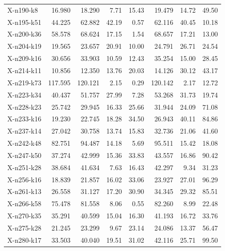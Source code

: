 \begin{longtable}{@{}lrrrrrrr@{}}
X-n190-k8    &     16.980 &      18.290 &   7.71 &  15.43 &      19.479 &  14.72 &  49.50 \\
X-n195-k51   &     44.225 &      62.882 &  42.19 &   0.57 &      62.116 &  40.45 &  10.18 \\
X-n200-k36   &     58.578 &      68.624 &  17.15 &   1.54 &      68.657 &  17.21 &  13.00 \\
X-n204-k19   &     19.565 &      23.657 &  20.91 &  10.00 &      24.791 &  26.71 &  24.54 \\
X-n209-k16   &     30.656 &      33.903 &  10.59 &  12.43 &      35.254 &  15.00 &  28.45 \\
X-n214-k11   &     10.856 &      12.350 &  13.76 &  20.03 &      14.126 &  30.12 &  43.17 \\
X-n219-k73   &    117.595 &     120.121 &   2.15 &   0.29 &     120.142 &   2.17 &  12.72 \\
X-n223-k34   &     40.437 &      51.757 &  27.99 &   7.28 &      53.268 &  31.73 &  19.74 \\
X-n228-k23   &     25.742 &      29.945 &  16.33 &  25.66 &      31.944 &  24.09 &  71.08 \\
X-n233-k16   &     19.230 &      22.745 &  18.28 &  34.50 &      26.943 &  40.11 &  84.86 \\
X-n237-k14   &     27.042 &      30.758 &  13.74 &  15.83 &      32.736 &  21.06 &  41.60 \\
X-n242-k48   &     82.751 &      94.487 &  14.18 &   5.69 &      95.511 &  15.42 &  18.08 \\
X-n247-k50   &     37.274 &      42.999 &  15.36 &  33.83 &      43.557 &  16.86 &  90.42 \\
X-n251-k28   &     38.684 &      41.634 &   7.63 &  16.43 &      42.297 &   9.34 &  31.23 \\
X-n256-k16   &     18.839 &      21.857 &  16.02 &  33.06 &      23.927 &  27.01 &  96.29 \\
X-n261-k13   &     26.558 &      31.127 &  17.20 &  30.90 &      34.345 &  29.32 &  85.51 \\
X-n266-k58   &     75.478 &      81.558 &   8.06 &   0.55 &      82.260 &   8.99 &  22.48 \\
X-n270-k35   &     35.291 &      40.599 &  15.04 &  16.30 &      41.193 &  16.72 &  33.76 \\
X-n275-k28   &     21.245 &      23.299 &   9.67 &  23.14 &      24.086 &  13.37 &  56.47 \\
X-n280-k17   &     33.503 &      40.040 &  19.51 &  31.02 &      42.116 &  25.71 &  99.50 \\

\end{longtable}
